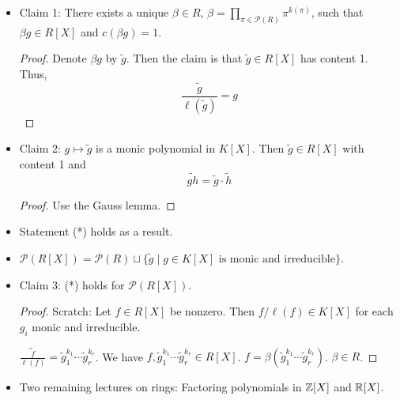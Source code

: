 \documentclass[../notes.tex]{subfiles}
\begin{document}
\begin{itemize}
    \item Claim 1: There exists a unique $\beta\in R$, $\beta=\prod_{\pi\in\mathcal{P}(R)}\pi^{k(\pi)}$, such that $\beta g\in R[X]$ and $c(\beta g)=1$.
    \begin{proof}
        Denote $\beta g$ by $\tilde{g}$. Then the claim is that $\tilde{g}\in R[X]$ has content 1. Thus,
        \begin{equation*}
            \frac{\tilde{g}}{\ell(\tilde{g})} = g
        \end{equation*}
    \end{proof}
    \item Claim 2: $g\mapsto\tilde{g}$ is a monic polynomial in $K[X]$. Then $\tilde{g}\in R[X]$ with content 1 and
    \begin{equation*}
        \widetilde{gh} = \tilde{g}\cdot\tilde{h}
    \end{equation*}
    \begin{proof}
        Use the Gauss lemma.
    \end{proof}
    \item Statement (*) holds as a result.
    \item $\mathcal{P}(R[X])=\mathcal{P}(R)\sqcup\{\tilde{g}\mid g\in K[X]\text{ is monic and irreducible}\}$.
    \item Claim 3: (*) holds for $\mathcal{P}(R[X])$.
    \begin{proof}
        Scratch: Let $f\in R[X]$ be nonzero. Then $f/\ell(f)\in K[X]$ for each $g_i$ monic and irreducible.\par
        $\widetilde{\frac{f}{\ell(f)}}=\tilde{g}_1^{k_1}\cdots\tilde{g}_r^{k_r}$. We have $f,\tilde{g}_1^{k_1}\cdots\tilde{g}_r^{k_r}\in R[X]$. $f=\beta(\tilde{g}_1^{k_1}\cdots\tilde{g}_r^{k_r})$. $\beta\in R$.
    \end{proof}
    \item Two remaining lectures on rings: Factoring polynomials in $\mathbb{Z}[X]$ and $\mathbb{R}[X]$.
\end{itemize}
\end{document}
